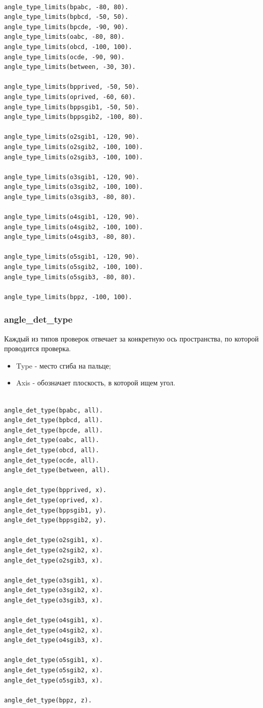 \begin{lstlisting}[caption=Знания об амплитудах углов, label=list:angle_limits]
%angle_type_limits(Finger, MinAngle, MaxAngle)

angle_type_limits(bpabc, -80, 80).
angle_type_limits(bpbcd, -50, 50).
angle_type_limits(bpcde, -90, 90).
angle_type_limits(oabc, -80, 80).
angle_type_limits(obcd, -100, 100).
angle_type_limits(ocde, -90, 90).
angle_type_limits(between, -30, 30).

angle_type_limits(bpprived, -50, 50).
angle_type_limits(oprived, -60, 60).
angle_type_limits(bppsgib1, -50, 50).
angle_type_limits(bppsgib2, -100, 80).

angle_type_limits(o2sgib1, -120, 90).
angle_type_limits(o2sgib2, -100, 100).
angle_type_limits(o2sgib3, -100, 100).

angle_type_limits(o3sgib1, -120, 90).
angle_type_limits(o3sgib2, -100, 100).
angle_type_limits(o3sgib3, -80, 80).

angle_type_limits(o4sgib1, -120, 90).
angle_type_limits(o4sgib2, -100, 100).
angle_type_limits(o4sgib3, -80, 80).

angle_type_limits(o5sgib1, -120, 90).
angle_type_limits(o5sgib2, -100, 100).
angle_type_limits(o5sgib3, -80, 80).

angle_type_limits(bppz, -100, 100).
\end{lstlisting}

\subsubsection{angle\_det\_type}
\hspace{0.6cm} Каждый из типов проверок отвечает за конкретную ось пространства, по которой проводится проверка.

\begin{itemize}
	\item Type - место сгиба на пальце;
	\item Axis - обозначает плоскость, в которой ищем угол.
\end{itemize}

\begin{lstlisting}[caption=Знания об осях типов проверок, label=list:angledettype]
%angle_det_type(Type, Axis)

angle_det_type(bpabc, all).
angle_det_type(bpbcd, all).
angle_det_type(bpcde, all).
angle_det_type(oabc, all).
angle_det_type(obcd, all).
angle_det_type(ocde, all).
angle_det_type(between, all).

angle_det_type(bpprived, x).
angle_det_type(oprived, x).
angle_det_type(bppsgib1, y).
angle_det_type(bppsgib2, y).

angle_det_type(o2sgib1, x).
angle_det_type(o2sgib2, x).
angle_det_type(o2sgib3, x).

angle_det_type(o3sgib1, x).
angle_det_type(o3sgib2, x).
angle_det_type(o3sgib3, x).

angle_det_type(o4sgib1, x).
angle_det_type(o4sgib2, x).
angle_det_type(o4sgib3, x).

angle_det_type(o5sgib1, x).
angle_det_type(o5sgib2, x).
angle_det_type(o5sgib3, x).

angle_det_type(bppz, z).
\end{lstlisting}


